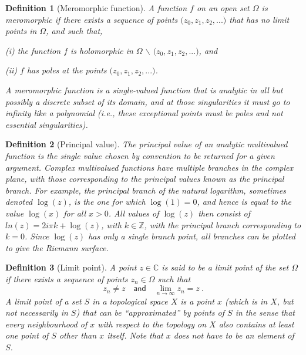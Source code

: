 \documentclass[10pt]{book}
\newcommand{\Cbb}{\mathbb{C}}
\newcommand{\Zbb}{\mathbb{Z}}
\theoremstyle{break}
\newtheorem{definition}{Definition}
\begin{document}
\begin{definition}[Meromorphic function]
 A function $f$ on an open set $\Omega$ is meromorphic if there exists a sequence of points $\big( z_0 , z_1 , z_2 , . . .\big)$ that has no limit points in $\Omega$, and such that,
 \begin{description}
  \item (i) the function $f$ is holomorphic in $\Omega$ $\backslash$ $\big(z_0 , z_1 , z_2 , . . .\big)$, and
  \item (ii) $f$ has poles at the points $\big(z_0 , z_1 , z_2 , . . .\big)$.
 \end{description} 
 A meromorphic function is a single-valued function that is analytic in all but possibly a discrete subset of its domain, and at those singularities it must go to infinity like a polynomial (i.e., these exceptional points must be poles and not essential singularities). 
\end{definition}

\begin{definition}[Principal value]
 The principal value of an analytic multivalued function is the single value chosen by convention to be returned for a given argument. Complex multivalued functions have multiple branches in the complex plane, with those corresponding to the principal values known as the principal branch. For example, the principal branch of the natural logarithm, sometimes denoted $\log(z)$, is the one for which $\log(1)=0$, and hence is equal to the value $\log(x)$ for all $x>0$. All values of $\log(z)$ then consist of $ln(z) = 2 i \pi k + \log(z)$, with $k \in \Zbb$, with the principal branch corresponding to $k=0$. Since $\log(z)$ has only a single branch point, all branches can be plotted to give the Riemann surface.  
\end{definition}

\begin{definition}[Limit point]
 A point $z\in \Cbb$ is said to be a limit point af the set $\Omega$ if there exists a sequence of points $z_n \in \Omega$ such that 
 \begin{equation*}
  z_n \neq z \quad \mathsf{and} \quad \lim_{n \to \infty} z_n = z \ . 
 \end{equation*}
 A limit point of a set $S$ in a topological space $X$ is a point $x$ (which is in $X$, but not necessarily in $S$) that can be ``approximated'' by points of $S$ in the sense that every neighbourhood of $x$ with respect to the topology on $X$ also contains at least one point of $S$ other than $x$ itself. Note that $x$ does not have to be an element of $S$.  
\end{definition}
\end{document}
